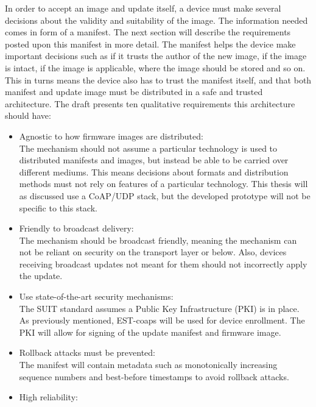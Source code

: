 \documentclass[0-thesis.tex]{subfiles}
\begin{document}
In order to accept an image and update itself, a device must make several decisions about
the validity and suitability of the image. The information needed comes in form of a
manifest. The next section will describe the requirements posted upon this manifest in
more detail. The manifest helps the device make important decisions such as if it trusts
the author of the new image, if the image is intact, if the image is applicable, where the
image should be stored and so on. This in turns means the device also has to trust the
manifest itself, and that both manifest and update image must be distributed in a safe and
trusted architecture. The draft \parencite{suit-architecture} presents ten qualitative
requirements this architecture should have:

\begin{itemize}
    \item Agnostic to how firmware images are distributed:\\
            The mechanism should not assume a particular technology is used to distributed
            manifests and images, but instead be able to be carried over different
            mediums. This means decisions about formats and distribution methods must not
            rely on features of a particular technology. This thesis will as discussed use
            a CoAP/UDP stack, but the developed prototype will not be specific to this
            stack.
    \item Friendly to broadcast delivery:\\
            The mechanism should be broadcast friendly, meaning the mechanism can not be
            reliant on security on the transport layer or below. Also, devices receiving
            broadcast updates not meant for them should not incorrectly apply the update.
    \item Use state-of-the-art security mechanisms:\\
            The SUIT standard assumes a Public Key Infrastructure (PKI) is in place. As
            previously mentioned, EST-coaps will be used for device enrollment. The PKI
            will allow for signing of the update manifest and firmware image.
    \item Rollback attacks must be prevented:\\
            The manifest will contain metadata such as monotonically increasing sequence
            numbers and best-before timestamps to avoid rollback attacks.
    \item High reliability:\\

\end{itemize}
\end{document}
